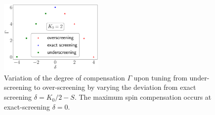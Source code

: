 \documentclass[reprint,prb,superscriptaddress]{revtex4-2}
\begin{document}
\begin{figure}[htpb]
	\centering
	\includegraphics[width=0.45\textwidth]{degofcomp.pdf}
	\caption{Variation of the degree of compensation $\Gamma$ upon tuning from under-screening to over-screening by varying the deviation from exact screening $\delta=K_{0}/2-S$. The maximum spin compensation occurs at exact-screening \(\delta=0\).}
	\label{compen}
\end{figure}
\end{document}
